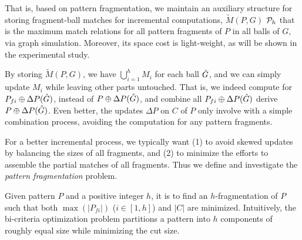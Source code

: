 That is, based on pattern fragmentation, we maintain
an auxiliary structure for storing fragment-ball matches for incremental computations,
\ie $\tilde{M}(P,G)$ \wrt ${\cal P}_{h}$ that is the maximum match relations for all pattern fragments of $P$ in all balls of $G$, via graph simulation.
Moreover, its space cost is light-weight, as will be shown in the experimental study.



By storing $\tilde{M}(P,G)$, we have $\bigcup_{i=1}^{h}M_{i}$ for each ball $\hat{G}{}$,
and we can simply update $M_i$ while leaving other parts untouched. That is, we indeed compute for $P_{fi}\oplus\Delta P(\hat{G}{})$, instead of $P\oplus\Delta P(\hat{G}{})$, and combine all $P_{fi}\oplus\Delta P(\hat{G}{})$ derive $P\oplus\Delta P(\hat{G}{})$.
Even better, the updates $\Delta P$ on $C$ of $P$ only involve with a simple combination process, avoiding the computation for any pattern fragments.


For a better incremental process, we typically want (1) to avoid skewed updates by balancing the sizes of all fragments, and (2) to minimize the efforts to assemble the partial matches of all fragments.
Thus we define and investigate the {\em pattern fragmentation} problem.

Given pattern $P$ and a positive integer $h$, it is to find
an $h$-fragmentation of $P$ such that both $\max(|P_{fi}|)$ ($i\in[1,h]$) and $|C|$ are minimized.
Intuitively, the bi-criteria optimization problem partitions a pattern into $h$ components of roughly equal size while minimizing the cut size.

\eat{%
Given $P$ and a positive integer $h$, the {\em pattern fragmentation}  problem is to find
an $h$-fragmentation of $P$ such that both $\max(|P_{fi}|)$ ($i\in[1,h]$) and $|C|$ are minimized.
%
Intuitively, we want (1)  to avoid skewed updates by making all fragments roughly the same size and (2) to  minimize the efforts to assemble the partial matches of all fragments.
}%

